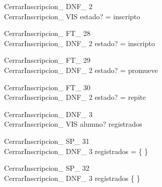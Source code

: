 \documentclass{article}
\begin{document}
 
 \begin{schema}{CerrarInscripcion\_ DNF\_ 2}\\
  CerrarInscripcion\_ VIS 
 \where
  estado? = inscripto
 \end{schema}
 
 
 \begin{schema}{CerrarInscripcion\_ FT\_ 28}\\
  CerrarInscripcion\_ DNF\_ 2 
 \where
  estado? = inscripto
 \end{schema}
 
 
 \begin{schema}{CerrarInscripcion\_ FT\_ 29}\\
  CerrarInscripcion\_ DNF\_ 2 
 \where
  estado? = promueve
 \end{schema}
 
 
 \begin{schema}{CerrarInscripcion\_ FT\_ 30}\\
  CerrarInscripcion\_ DNF\_ 2 
 \where
  estado? = repite
 \end{schema}
 
 
 \begin{schema}{CerrarInscripcion\_ DNF\_ 3}\\
  CerrarInscripcion\_ VIS 
 \where
  alumno? \notin registrados
 \end{schema}
 
 
 \begin{schema}{CerrarInscripcion\_ SP\_ 31}\\
  CerrarInscripcion\_ DNF\_ 3 
 \where
  registrados = \{ \}
 \end{schema}
 
 
 \begin{schema}{CerrarInscripcion\_ SP\_ 32}\\
  CerrarInscripcion\_ DNF\_ 3 
 \where
  registrados \neq \{ \}
 \end{schema}
\end{document}

